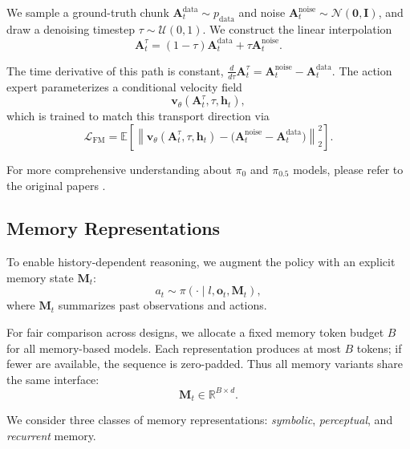 We sample a ground-truth chunk
$\mathbf{A}_t^{\text{data}} \sim p_{\text{data}}$
and noise
$\mathbf{A}_t^{\text{noise}} \sim \mathcal{N}(\mathbf{0}, \mathbf{I})$,
and draw a denoising timestep $\tau \sim \mathcal{U}(0,1)$.
We construct the linear interpolation
\begin{equation}
\mathbf{A}_t^\tau
=
(1-\tau)\mathbf{A}_t^{\text{data}}
+
\tau \mathbf{A}_t^{\text{noise}} .
\end{equation}

The time derivative of this path is constant,
$\frac{d}{d\tau}\mathbf{A}_t^\tau=\mathbf{A}_t^{\text{noise}}-\mathbf{A}_t^{\text{data}}$.
The action expert parameterizes a conditional velocity field
\begin{equation}
\mathbf{v}_\theta(\mathbf{A}_t^\tau, \tau, \mathbf{h}_t),
\end{equation}
which is trained to match this transport direction via
\begin{equation}
\mathcal{L}_{\mathrm{FM}}
=
\mathbb{E}
\left[
\left\|
\mathbf{v}_\theta(\mathbf{A}_t^\tau, \tau, \mathbf{h}_t)
-
\big(
\mathbf{A}_t^{\text{noise}}
-
\mathbf{A}_t^{\text{data}}
\big)
\right\|_2^2
\right].
\end{equation}

For more comprehensive understanding about $\pi_{0}$ and $\pi_{0.5}$ models, please refer to the original papers \cite{pi05, pi0}.

\subsection{Memory Representations}
\label{sec:memory_repr}

To enable history-dependent reasoning, we augment the policy with an explicit memory state $\mathbf{M}_t$:
\[
a_t \sim \pi(\cdot \mid l, \mathbf{o}_t, \mathbf{M}_t),
\]
where $\mathbf{M}_t$ summarizes past observations and actions.

For fair comparison across designs, we allocate a fixed memory token budget $B$ for all memory-based models. Each representation produces at most $B$ tokens; if fewer are available, the sequence is zero-padded. Thus all memory variants share the same interface:
\[
\mathbf{M}_t \in \mathbb{R}^{B \times d}.
\]

We consider three classes of memory representations: \textit{symbolic}, \textit{perceptual}, and \textit{recurrent} memory.

